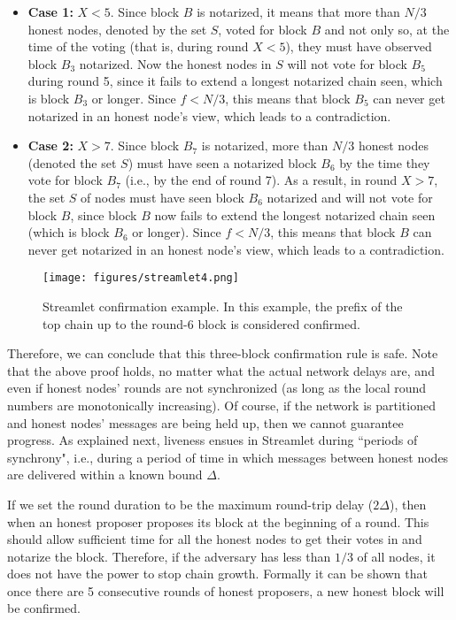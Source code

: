 \documentclass{article}
\begin{document}
\begin{itemize}
    \item {\bf Case 1:} $X < 5$. Since block $B$ is notarized, it means that more than $N/3$ honest nodes, denoted by the set $S$, voted for block $B$ and not only so, at the time of the voting (that is, during round $X < 5$), they must have observed block $B_3$ notarized. Now the honest nodes in $S$ will not vote for block $B_5$ during round 5, since it fails to extend a longest notarized chain seen, which is block $B_3$ or longer. Since $f < N/3$, this means that block $B_5$ can never get notarized in an honest node's view, which leads to a contradiction.
    \item {\bf Case 2:} $X > 7$. Since block $B_7$ is notarized, more than $N/3$ honest nodes (denoted the set $S$) must have seen a notarized block $B_6$ by the time they vote for block $B_7$ (i.e., by the end of round 7). As a result, in round $X > 7$, the set $S$ of nodes must have seen block $B_6$ notarized and will not vote for block $B$, since block $B$ now fails to extend the longest notarized chain seen (which is block $B_6$ or longer). Since $f < N/3$, this means that block $B$ can never get notarized in an honest node's view, which leads to a contradiction.
\end{itemize}

\begin{figure}
    \centering
    \texttt{[image: figures/streamlet4.png]}
    \caption{Streamlet confirmation example. In this example, the prefix of the top chain up to the round-6 block is considered confirmed.}
    \label{fig:streamlet4}
\end{figure}

Therefore, we can conclude that this three-block confirmation rule is safe. Note that the above proof holds, no matter what the actual network delays are, and even if honest nodes’ rounds are not synchronized (as long as the local round numbers are monotonically increasing). Of course, if the network is partitioned and honest nodes’ messages are being held up, then we cannot guarantee progress. As explained next, liveness ensues in Streamlet during ``periods of synchrony", i.e., during a period of time in which messages between honest nodes are delivered within a known bound $\Delta$.


If we set the round duration to be the maximum round-trip delay ($2\Delta$), then when an honest proposer proposes its block at the beginning of a round. This should allow sufficient time for all the honest nodes to get their votes in and notarize the block. Therefore, if the adversary has less than $1/3$ of all nodes, it does not have the power to stop chain growth. Formally it can be shown that once there are 5 consecutive rounds of honest proposers, a new honest block will be confirmed.
\end{document}

